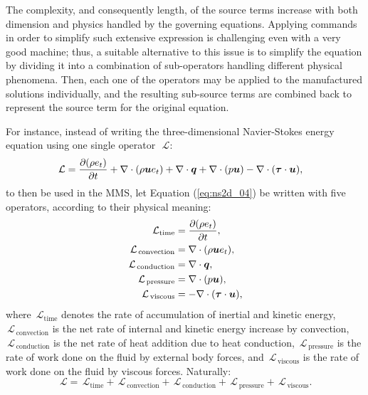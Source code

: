 \documentclass[10pt]{article}
\newcommand{\Diff}[2] {\dfrac{\partial( #1)}{\partial #2}}
\newcommand{\bv}[1]{\ensuremath{\mbox{\boldmath$ #1 $}}}
\newcommand{\Lo}{\,\mathcal{L}}
\newcommand{\convection}{\,\text{convection}}
\newcommand{\conduction}{\,\text{conduction}}
\newcommand{\viscous}{\,\text{viscous}}
\newcommand{\pressure}{\,\text{pressure}}
\begin{document}
The complexity, and consequently length, of the source terms increase with both dimension and physics handled by the governing equations. 
Applying commands in order to simplify such extensive expression is challenging even with a very good machine; thus, a suitable alternative to this issue is to simplify the equation by dividing it into a combination of sub-operators handling different physical phenomena. Then, each one of the operators may be applied to the manufactured solutions individually, and the resulting sub-source terms are combined back to represent the source term for the original equation.



For instance, instead of writing the three-dimensional Navier-Stokes energy equation using one single operator~$\Lo$:
\begin{equation}
 \label{eq:ns2d_04}
\begin{split}
\Lo= \Diff{\rho e_t}{t}&+\nabla \cdot (\rho\bv{u}e_t) +\nabla\cdot \bv{q} +  \nabla\cdot(p  \bv{u})  - \nabla \cdot (\bv{\tau} \cdot \bv{u}),
\end{split}
\end{equation}
to then be used in the MMS, let Equation (\ref{eq:ns2d_04}) be written with five operators, according to their physical meaning:
\begin{equation}
 \begin{split}\label{sub01}
  \Lo_{\text{time}}&=\Diff{\rho e_t}{t} ,\\
  \Lo_{\convection}&=\nabla \cdot (\rho\bv{u}e_t),\\
  \Lo_{\conduction}&=\nabla\cdot \bv{q},\\
  \Lo_{\pressure}&= \nabla\cdot(p  \bv{u}),\\
  \Lo_{\viscous}&=- \nabla \cdot (\bv{\tau} \cdot \bv{u}),
 \end{split}
\end{equation}
where $\Lo_{\text{time}}$ denotes the rate of accumulation of inertial and kinetic energy, $\Lo_{\convection}$ is the net rate of internal and kinetic energy increase by convection, $\Lo_{\conduction}$ is the net rate of heat addition due to heat conduction, $\Lo_{\pressure}$ is the rate of work done on the fluid by external body forces, and $\Lo_{\viscous}$ is the rate of work done on the fluid by viscous forces. Naturally:
$$\Lo=\Lo_{\text{time}}+\Lo_{\convection}+\Lo_{\conduction}+\Lo_{\pressure}+\Lo_{\viscous}.$$
\end{document}
